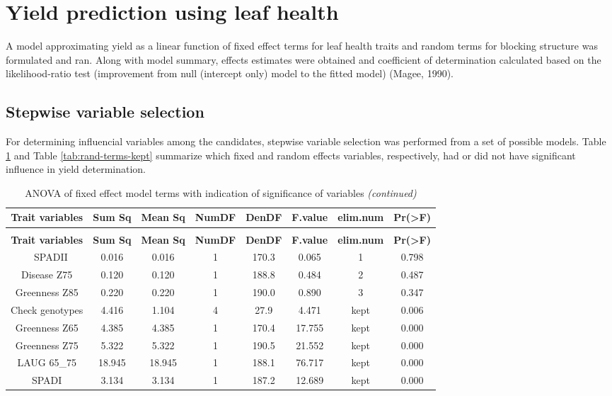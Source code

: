 \documentclass[12pt,oneside]{dukestatscithesis} %
\begin{document}
\hypertarget{yield-prediction-using-leaf-health}{%
\section{Yield prediction using leaf health}\label{yield-prediction-using-leaf-health}}

A model approximating yield as a linear function of fixed effect terms for leaf health traits and random terms for blocking structure was formulated and ran. Along with model summary, effects estimates were obtained and coefficient of determination calculated based on the likelihood-ratio test (improvement from null (intercept only) model to the fitted model) (Magee, 1990).

\hypertarget{stepwise-variable-selection}{%
\subsection{Stepwise variable selection}\label{stepwise-variable-selection}}

For determining influencial variables among the candidates, stepwise variable selection was performed from a set of possible models. Table \ref{tab:fixed-terms-kept} and Table \ref{tab:rand-terms-kept} summarize which fixed and random effects variables, respectively, had or did not have significant influence in yield determination.

\begingroup\fontsize{10}{12}\selectfont
\begin{longtable}[t]{cccccccc}
\caption{\label{tab:fixed-terms-kept}ANOVA of fixed effect model terms with indication of significance of variables}\\
\toprule
\textbf{Trait variables} & \textbf{Sum Sq} & \textbf{Mean Sq} & \textbf{NumDF} & \textbf{DenDF} & \textbf{F.value} & \textbf{elim.num} & \textbf{Pr(>F)}\\
\midrule
\endfirsthead
\caption[]{\label{tab:fixed-terms-kept}ANOVA of fixed effect model terms with indication of significance of variables \textit{(continued)}}\\
\toprule
\textbf{Trait variables} & \textbf{Sum Sq} & \textbf{Mean Sq} & \textbf{NumDF} & \textbf{DenDF} & \textbf{F.value} & \textbf{elim.num} & \textbf{Pr(>F)}\\
\midrule
\endhead
\
\endfoot
\bottomrule
\endlastfoot
SPADII & 0.016 & 0.016 & 1 & 170.3 & 0.065 & 1 & 0.798\\
Disease Z75 & 0.120 & 0.120 & 1 & 188.8 & 0.484 & 2 & 0.487\\
Greenness Z85 & 0.220 & 0.220 & 1 & 190.0 & 0.890 & 3 & 0.347\\
Check genotypes & 4.416 & 1.104 & 4 & 27.9 & 4.471 & kept & 0.006\\
Greenness Z65 & 4.385 & 4.385 & 1 & 170.4 & 17.755 & kept & 0.000\\
Greenness Z75 & 5.322 & 5.322 & 1 & 190.5 & 21.552 & kept & 0.000\\
LAUG 65\_75 & 18.945 & 18.945 & 1 & 188.1 & 76.717 & kept & 0.000\\
SPADI & 3.134 & 3.134 & 1 & 187.2 & 12.689 & kept & 0.000\\*
\end{longtable}
\endgroup{}
\end{document}
